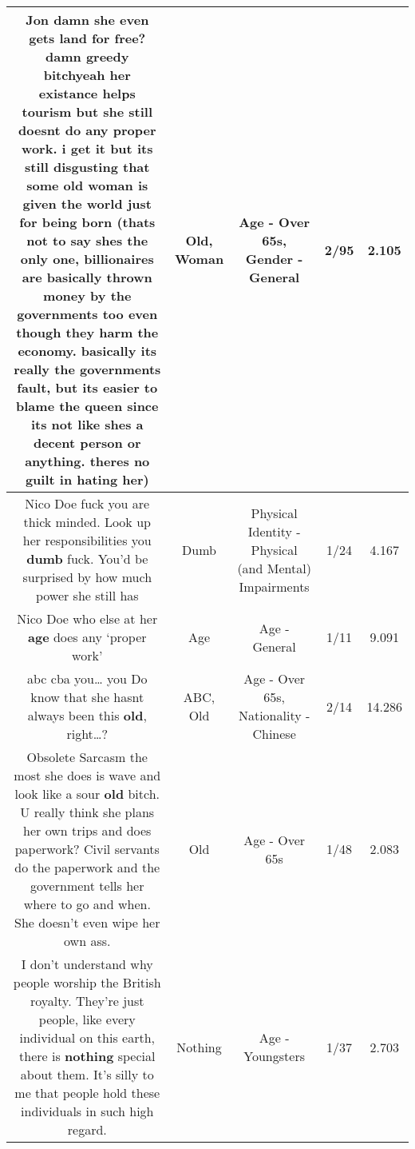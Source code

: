\documentclass[11pt]{article}
\newlength\mylength
\begin{document}
\begin{center}
\begin{longtable}{|C{.65\mylength}|C{.30\mylength}|C{.12\mylength}|C{.12\mylength}|C{.12\mylength}|}
  \small Jon damn she even gets land for free? damn greedy bitchyeah her existance helps tourism but she still doesnt do any proper work. i get it but its still disgusting that some \textbf{old} \textbf{woman} is given the world just for being born (thats not to say shes the only one, billionaires are basically thrown money by the governments too even though they harm the economy. basically its really the governments fault, but its easier to blame the queen since its not like shes a decent person or anything. theres no guilt in hating her)\normalsize   & Old, Woman & Age - Over 65s, Gender - General & 2/95 & 2.105 \\  \hline
  \small Nico Doe fuck you are thick minded. Look up her responsibilities you \textbf{dumb} fuck. You'd be surprised by how much power she still has\normalsize   & Dumb & Physical Identity - Physical (and Mental) Impairments & 1/24 & 4.167 \\  \hline
  \small Nico Doe who else at her \textbf{age} does any ‘proper work'\normalsize   & Age & Age - General & 1/11 & 9.091 \\  \hline
  \small abc cba you… you Do know that she hasnt always been this \textbf{old}, right…?\normalsize   & ABC, Old & Age - Over 65s, Nationality - Chinese & 2/14 & 14.286 \\  \hline
  \small Obsolete Sarcasm the most she does is wave and look like a sour \textbf{old} bitch. U really think she plans her own trips and does paperwork? Civil servants do the paperwork and the government tells her where to go and when. She doesn't even wipe her own ass.\normalsize   & Old & Age - Over 65s & 1/48 & 2.083 \\  \hline
  \small I don't understand why people worship the British royalty. They're just people, like every individual on this earth, there is \textbf{nothing} special about them. It's silly to me that people hold these individuals in such high regard.\normalsize   & Nothing & Age - Youngsters & 1/37 & 2.703 \\  \hline

\end{longtable}
\end{center}
\end{document}
